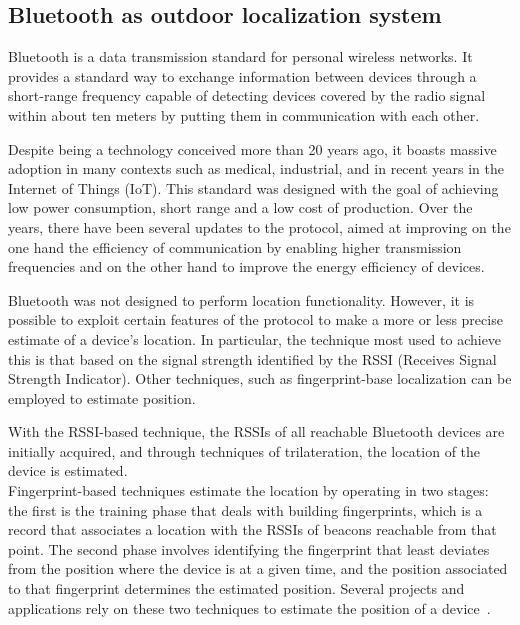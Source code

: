 


\subsection{Bluetooth as outdoor localization system}
Bluetooth is a data transmission standard for personal wireless networks. It provides a standard way to exchange information between
devices through a short-range frequency capable of detecting devices covered by the radio signal within about ten meters by putting them
in communication with each other.

Despite being a technology conceived more than 20 years ago, it boasts massive adoption in many contexts such as medical, industrial, and in
recent years in the Internet of Things (IoT). This standard was designed with the goal of achieving low power consumption, short range
and a low cost of production. Over the years, there have been several updates to the protocol, aimed at improving on the one hand the efficiency of
communication by enabling higher transmission frequencies and on the other hand to improve the energy efficiency of devices.

Bluetooth was not designed to perform location functionality. However, it is possible to exploit certain
features of the protocol to make a more or less precise estimate of a device's location. In particular, the technique most
used to achieve this is that based on the signal strength identified by the RSSI (Receives Signal Strength Indicator).
Other techniques, such as fingerprint-base localization can be employed to estimate position.

With the RSSI-based technique, the RSSIs of all reachable Bluetooth devices are initially acquired, and through techniques of trilateration, the
location of the device is estimated.\\
Fingerprint-based techniques estimate the location by operating in two stages: the first is the training phase that deals with building fingerprints, which is a record that associates a location with the RSSIs of beacons reachable from that
point. The second phase involves identifying the fingerprint that least deviates from the position where the device is at a given time, and the
position associated to that fingerprint determines the estimated position. Several projects and applications rely on these two techniques to estimate
the position of a device~\cite{mcconville2021vesta, samuel2021smart}.

